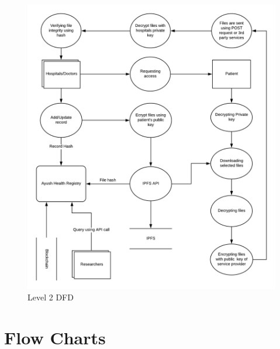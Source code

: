 \documentclass[11pt]{report}
\begin{document}
    \begin{figure}[h!]
        \centering
        \includegraphics[scale=0.9]{DFD2.png}
        \caption{Level 2 DFD}
        \label{fig:my_label}
    \end{figure}
        

\section{Flow Charts}   
\end{document}
